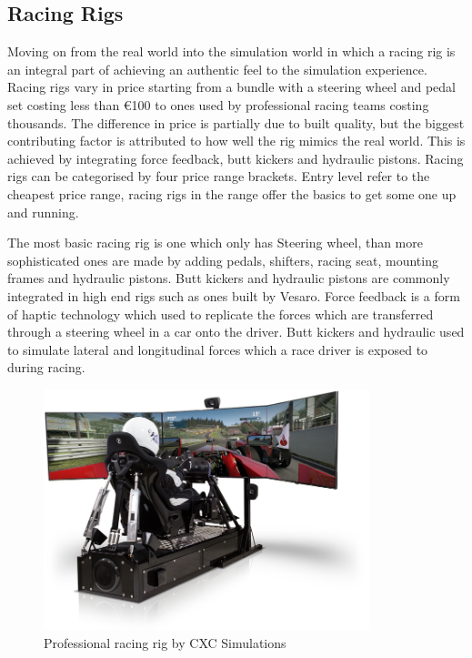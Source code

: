 \subsection{Racing Rigs}

Moving on from the real world into the simulation world in which a racing rig is an integral part of achieving an authentic feel to the simulation experience. Racing rigs vary in price starting from a bundle with a steering wheel and pedal set costing less than €100 to ones used by professional racing teams costing thousands. The difference in price is partially due to built quality, but the biggest contributing factor is attributed to how well the rig mimics the real world. This is achieved by integrating force feedback, butt kickers and hydraulic pistons. Racing rigs can be categorised by four price range brackets. Entry level refer to the cheapest price range, racing rigs in the range offer the basics to get some one up and running.

The most basic racing rig is one which only has Steering wheel, than more sophisticated ones are made by adding pedals, shifters, racing seat, mounting frames and hydraulic pistons. Butt kickers and hydraulic pistons are commonly integrated in high end rigs such as ones built by Vesaro. Force feedback is a form of haptic technology which used to replicate the forces which are transferred through a steering wheel in a car onto the driver\cite{li2015can}. Butt kickers and hydraulic used to simulate lateral and longitudinal forces which a race driver is exposed to during racing.

\begin{figure}[!htb]
	\centering
	\includegraphics[height=7cm]{images/proracingrig.png}
	\caption{Professional racing rig by CXC Simulations}
	\label{fig:slipangle}
\end{figure}







